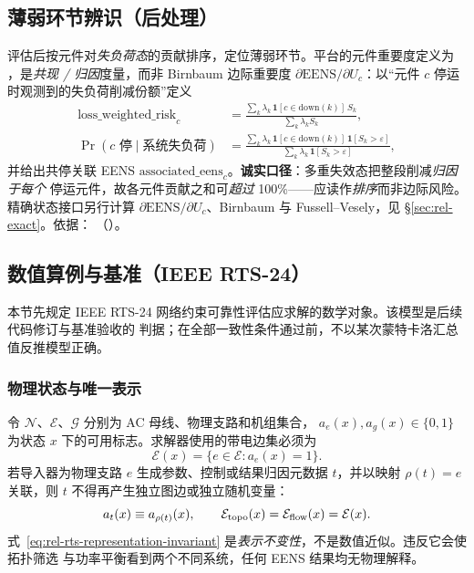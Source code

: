 \subsection{薄弱环节辨识（后处理）}\label{sec:rel-th-weakpoint}
评估后按元件对\emph{失负荷态}的贡献排序，定位薄弱环节。平台的元件重要度定义为
，是\emph{共现 / 归因}度量，而非 Birnbaum 边际重要度
$\partial\mathrm{EENS}/\partial U_c$：以“元件 $c$ 停运时观测到的失负荷削减份额”定义
\begin{align}
 \text{loss\_weighted\_risk}_c&=\frac{\sum_k\lambda_k\,\mathbf 1[c\in\text{down}(k)]\,S_k}{\sum_k\lambda_k S_k},\\
 \Pr(c\text{ 停}\mid\text{系统失负荷})&=\frac{\sum_k\lambda_k\,\mathbf 1[c\in\text{down}(k)]\,\mathbf 1[S_k>\varepsilon]}{\sum_k\lambda_k\,\mathbf 1[S_k>\varepsilon]},
\end{align}
并给出共停关联 EENS $\text{associated\_eens}_c$。\textbf{诚实口径}：多重失效态把整段削减\emph{归因于每个}
停运元件，故各元件贡献之和可\emph{超过} 100\%——应读作\emph{排序}而非边际风险。精确状态接口另行计算
$\partial\mathrm{EENS}/\partial U_c$、Birnbaum 与 Fussell--Vesely，见 \S\ref{sec:rel-exact}。依据：
（）。

\subsection{数值算例与基准（IEEE RTS-24）}\label{sec:rel-th-numexp}\label{sec:rel-th-state-consequence}
本节先规定 IEEE RTS-24 网络约束可靠性评估应求解的数学对象。该模型是后续代码修订与基准验收的
判据；在全部一致性条件通过前，不以某次蒙特卡洛汇总值反推模型正确。

\subsubsection{物理状态与唯一表示}
令 $\mathcal N$、$\mathcal E$、$\mathcal G$ 分别为 AC 母线、物理支路和机组集合，
$a_e(x),a_g(x)\in\{0,1\}$ 为状态 $x$ 下的可用标志。求解器使用的带电边集必须为
\begin{equation}
 \mathcal E(x)=\{e\in\mathcal E:a_e(x)=1\}.
 \label{eq:rel-rts-edge-set}
\end{equation}
若导入器为物理支路 $e$ 生成参数、控制或结果归因元数据 $t$，并以映射
$\rho(t)=e$ 关联，则 $t$ 不得再产生独立图边或独立随机变量：
\begin{equation}
 a_t(x)\equiv a_{\rho(t)}(x),\qquad
 \mathcal E_{\rm topo}(x)=\mathcal E_{\rm flow}(x)=\mathcal E(x).
 \label{eq:rel-rts-representation-invariant}
\end{equation}
式~\eqref{eq:rel-rts-representation-invariant} 是\emph{表示不变性}，不是数值近似。违反它会使拓扑筛选
与功率平衡看到两个不同系统，任何 EENS 结果均无物理解释。

